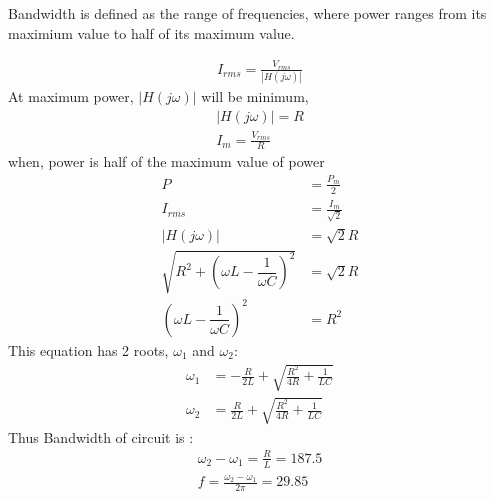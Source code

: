 \documentclass[journal,12pt,onecolumn]{IEEEtran}
\providecommand{\brak}[1]{\ensuremath{\left(#1\right)}}
\theoremstyle{remark}
\providecommand{\abs}[1]{\left\vert#1\right\vert}
\begin{document}
Bandwidth is defined as the range of frequencies, where power ranges from its maximium value to half of its maximum value.

\begin{align}
I_{rms} = \frac{V_{rms}}{\abs{H\brak{j\omega}}}      
\end{align}
At maximum power, $\abs{H\brak{j\omega}}$ will be minimum,
\begin{align}
\abs{H\brak{j\omega}} = R\\
I_{m} = \frac{V_{rms}}{R}
\end{align}
when, power is half of the maximum value of power
\begin{align}
P &= \frac{P_{m}}{2}\\
I_{rms} &= \frac{I_{m}}{\sqrt{2}}\\
\abs{H\brak{j\omega}}&=\sqrt{2}R\\
\sqrt{R^2 + \left(\omega L - \dfrac{1}{\omega C}\right)^2} &= \sqrt{2} R\\
\left(\omega L - \dfrac{1}{\omega C}\right)^2 &= R^{2}
\end{align}
This equation has 2 roots, $\omega_{1}$ and $\omega_{2}$:
\begin{align}
\omega_{1} &= -\frac{R}{2L} + \sqrt{\frac{R^{2}}{4R}+\frac{1}{LC}}\\
\omega_{2} &= \frac{R}{2L} + \sqrt{\frac{R^{2}}{4R}+\frac{1}{LC}}
\end{align}
Thus Bandwidth of circuit is :
\begin{align}
\omega_{2}-\omega_{1} = \frac{R}{L} = 187.5\\
f = \frac{\omega_{2}-\omega_{1}}{2\pi} = 29.85 
\end{align}
\end{document}
